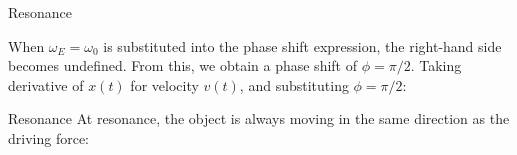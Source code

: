 \documentclass[12pt,compress,aspectratio=169]{beamer}
\begin{document}
\begin{frame}{Resonance}


  When $\omega_E=\omega_0$ is substituted into the phase shift
  expression, the
  right-hand side becomes undefined. From this, we obtain a phase shift of
  $\phi=\pi/2$. Taking derivative of $x(t)$ for velocity $v(t)$, and
  substituting $\phi=\pi/2$:
  
\end{frame}



\begin{frame}{Resonance}
  At resonance, the object is always moving in the same direction as the
  driving force:

  \vspace{-.4in}{\Large
    \begin{align*}
      v(t)&=A\omega_E\cos(\omega_E t)\\
      F_E(t)&=F\cos(\omega_E t)
    \end{align*}
  }
\end{frame}
\end{document}
